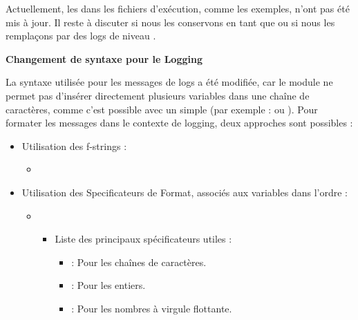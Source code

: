 \vspace{1em}

Actuellement, les  dans les fichiers d'exécution, comme les exemples, n'ont pas été mis à jour. Il reste à discuter si nous les conservons en tant que  ou si nous les remplaçons par des logs de niveau .

\vspace{1em}

\noindent\textbf{Changement de syntaxe pour le Logging}

La syntaxe utilisée pour les messages de logs a été modifiée, car le module  ne permet pas d'insérer directement plusieurs variables dans une chaîne de caractères, comme c'est possible avec un simple  (par exemple :  ou ). Pour formater les messages dans le contexte de logging, deux approches sont possibles :
\begin{itemize}[leftmargin=1.5cm]
    \item Utilisation des f-strings :
        \begin{itemize}
            \item {}
        \end{itemize}
    \item Utilisation des Specificateurs de Format, associés aux variables dans l'ordre :
        \begin{itemize}
            \item {}
                \begin{itemize}
                    \item Liste des principaux spécificateurs utiles :
                        \begin{itemize}
                            \item {} : Pour les chaînes de caractères.
                            \item {} : Pour les entiers.
                            \item {} : Pour les nombres à virgule flottante.
                        \end{itemize}
                \end{itemize}
        \end{itemize}
\end{itemize}